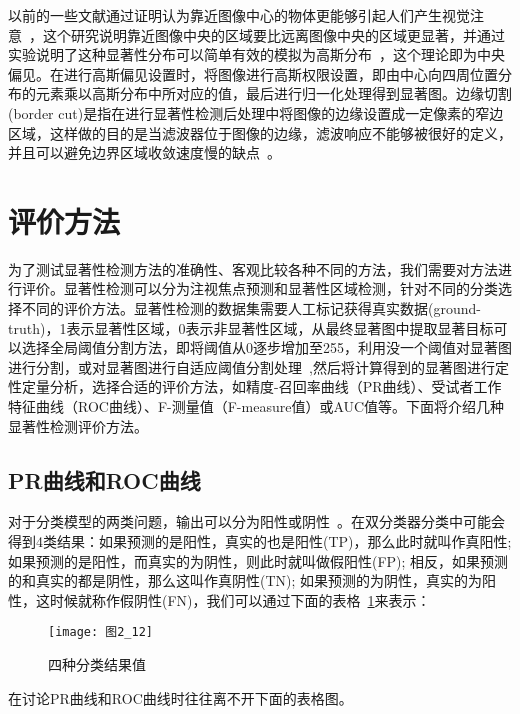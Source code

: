 以前的一些文献通过证明认为靠近图像中心的物体更能够引起人们产生视觉注意~\cite{JuddICCV2009Learning}，这个研究说明靠近图像中央的区域要比远离图像中央的区域更显著，并通过实验说明了这种显著性分布可以简单有效的模拟为高斯分布~\cite{ZhangLin2013SDSP}，这个理论即为中央偏见。在进行高斯偏见设置时，将图像进行高斯权限设置，即由中心向四周位置分布的元素乘以高斯分布中所对应的值，最后进行归一化处理得到显著图。边缘切割(border cut)是指在进行显著性检测后处理中将图像的边缘设置成一定像素的窄边区域，这样做的目的是当滤波器位于图像的边缘，滤波响应不能够被很好的定义，并且可以避免边界区域收敛速度慢的缺点~\cite{ChengMingMingCVPR2011Global}。

\section{评价方法}
\label{2_5}

为了测试显著性检测方法的准确性、客观比较各种不同的方法，我们需要对方法进行评价。显著性检测可以分为注视焦点预测和显著性区域检测\cite{LiYinCVPR2014Secrets}，针对不同的分类选择不同的评价方法。显著性检测的数据集需要人工标记获得真实数据(ground-truth)，1表示显著性区域，0表示非显著性区域，从最终显著图中提取显著目标可以选择全局阈值分割方法，即将阈值从0逐步增加至255，利用没一个阈值对显著图进行分割，或对显著图进行自适应阈值分割处理~\cite{AchantaCVPR2009Frequency},然后将计算得到的显著图进行定性定量分析，选择合适的评价方法，如精度-召回率曲线（PR曲线）、受试者工作特征曲线（ROC曲线）、F-测量值（F-measure值）或AUC值等。下面将介绍几种显著性检测评价方法。

\subsection{PR曲线和ROC曲线}
\label{2_5_1}

对于分类模型的两类问题，输出可以分为阳性或阴性~\cite{Powers2007Evaluation}。在双分类器分类中可能会得到4类结果：如果预测的是阳性，真实的也是阳性(TP)，那么此时就叫作真阳性; 如果预测的是阳性，而真实的为阴性，则此时就叫做假阳性(FP); 相反，如果预测的和真实的都是阴性，那么这叫作真阴性(TN); 如果预测的为阴性，真实的为阳性，这时候就称作假阴性(FN)，我们可以通过下面的表格~\ref{图2_12}来表示：
\begin{figure}[h] %
  \centering
  \texttt{[image: 图2\_12]}
  \caption{四种分类结果值}
  \label{图2_12}
\end{figure}
在讨论PR曲线和ROC曲线时往往离不开下面的表格图。

